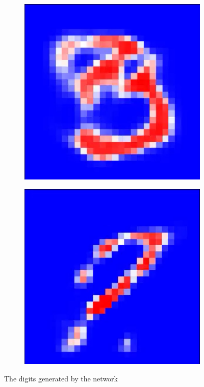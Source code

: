 \documentclass[a4paper]{article}
\begin{document}
\begin{figure}[ht]
\begin{subfigure}[b]{0.095\textwidth}
  \end{subfigure}
    \begin{subfigure}[b]{0.095\textwidth}
   \includegraphics[width=\linewidth]{figures/8.png}
  \end{subfigure}
    \begin{subfigure}[b]{0.095\textwidth}
   \includegraphics[width=\linewidth]{figures/9.png}
  \end{subfigure}
  \caption{The digits generated by the network}
  \label{fig:digits}
\end{figure}
\end{document}
